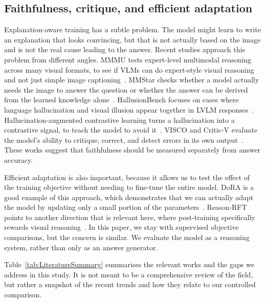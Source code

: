 \documentclass[preprint,12pt]{elsarticle}
\begin{document}
\subsection{Faithfulness, critique, and efficient adaptation}
Explanation-aware training has a subtle problem.
The model might learn to write an explanation that looks convincing,
but that is not actually based on the image and is not the real cause leading to the answer.
Recent studies approach this problem from different angles.
MMMU tests expert-level multimodal reasoning across many visual formats, to see if VLMs can do expert-style visual reasoning and not just simple image captioning~\cite{yue2024mmmu}.
MMStar checks whether a model actually needs the image to answer the question or whether the answer can be derived from the learned knowledge alone~\cite{chen2024mmstar}.
HallusionBench focuses on cases where language hallucination and visual illusion appear together in LVLM responses~\cite{guan2024hallusionbench}.
Hallucination-augmented contrastive learning turns a hallucination into a contrastive signal, to teach the model to avoid it~\cite{jiang2024hacl}.
VISCO and Critic-V evaluate the model's ability to critique, correct, and detect errors in its own output~\cite{wu2025visco,zhang2025criticv}.
These works suggest that faithfulness should be measured separately from answer accuracy.

Efficient adaptation is also important,
because it allows us to test the effect of the training objective without needing to fine-tune the entire model.
DoRA is a good example of this approach, which demonstrates that we can actually adapt the model by updating only a small portion of the parameters~\cite{liu2024dora}.
Reason-RFT points to another direction that is relevant here, where post-training specifically rewards visual reasoning~\cite{tan2025reasonrft}.
In this paper, we stay with supervised objective comparisons, but the concern is similar.
We evaluate the model as a reasoning system, rather than only as an answer generator.

Table~\ref{tab:LiteratureSummary} summarises the relevant works and the gaps we address in this study.
It is not meant to be a comprehensive review of the field, but rather a snapshot of the recent trends and how they relate to our controlled comparison.
\end{document}
